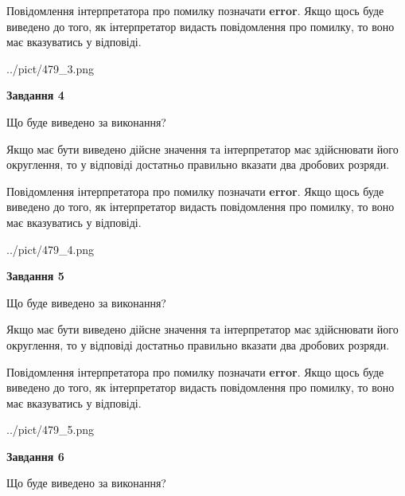 \documentclass[12pt, ukrainian]{article}
\begin{document}
{\begin {Large}
Повідомлення інтерпретатора про помилку позначати \textbf{error}.
Якщо щось буде виведено до того, як інтерпретатор видасть повідомлення про помилку, 
то воно має вказуватись у відповіді. \par

\begin{center}
	{../pict/479_3.png}
\end{center}
\newpage

{\begin {center}\textbf{Завдання 4}\end {center}}\par
Що буде виведено за виконання? \par

Якщо має бути виведено дійсне значення та інтерпретатор має здійснювати його округлення, 
то у відповіді достатньо правильно вказати два дробових розряди.

Повідомлення інтерпретатора про помилку позначати \textbf{error}.
Якщо щось буде виведено до того, як інтерпретатор видасть повідомлення про помилку, 
то воно має вказуватись у відповіді. \par

\begin{center}
	{../pict/479_4.png}
\end{center}
\newpage

{\begin {center}\textbf{Завдання 5}\end {center}}\par
Що буде виведено за виконання? \par

Якщо має бути виведено дійсне значення та інтерпретатор має здійснювати його округлення, 
то у відповіді достатньо правильно вказати два дробових розряди.

Повідомлення інтерпретатора про помилку позначати \textbf{error}.
Якщо щось буде виведено до того, як інтерпретатор видасть повідомлення про помилку, 
то воно має вказуватись у відповіді. \par

\begin{center}
	{../pict/479_5.png}
\end{center}
\newpage

{\begin {center}\textbf{Завдання 6}\end {center}}\par
Що буде виведено за виконання? \par


\end{Large}}
\end{document}
